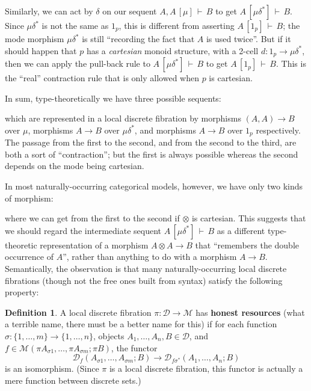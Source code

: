 \documentclass{amsart}
\theoremstyle{definition}
\newtheorem{defn}[thm]{Definition}
\def\M{\mathcal{M}}
\def\D{\mathcal{D}}
\newcommand\seq[3]{\ensuremath{#1 \, [ #2 ] \, \vdash \, #3}}
\begin{document}
Similarly, we can act by $\delta$ on our sequent $\seq{A,A}{\mu}{B}$ to get $\seq{A}{\mu\delta^*}{B}$.
Since $\mu\delta^*$ is not the same as $1_p$, this is different from asserting $\seq{A}{1_p}{B}$; the mode morphism $\mu\delta^*$ is still ``recording the fact that $A$ is used twice''.
But if it should happen that $p$ has a \emph{cartesian} monoid structure, with a 2-cell $d:1_p \to \mu\delta^*$, then we can apply the pull-back rule to $\seq{A}{\mu\delta^*}{B}$ to get $\seq{A}{1_p}{B}$.
This is the ``real'' contraction rule that is only allowed when $p$ is cartesian.

In sum, type-theoretically we have three possible sequents:
which are represented in a local discrete fibration by morphisms $(A,A)\to B$ over $\mu$, morphisms $A\to B$ over $\mu\delta^*$, and morphisms $A\to B$ over $1_p$ respectively.
The passage from the first to the second, and from the second to the third, are both a sort of ``contraction''; but the first is always possible whereas the second depends on the mode being cartesian.

In most naturally-occurring categorical models, however, we have only two kinds of morphism:
where we can get from the first to the second if $\otimes$ is cartesian.
This suggests that we should regard the intermediate sequent $\seq{A}{\mu\delta^*}{B}$ as a different type-theoretic representation of a morphism $A\otimes A\to B$ that ``remembers the double occurrence of $A$'', rather than anything to do with a morphism $A\to B$.
Semantically, the observation is that many naturally-occurring local discrete fibrations (though not the free ones built from syntax) satisfy the following property:

\begin{defn}
  A local discrete fibration $\pi:\D\to\M$ has \textbf{honest resources} (what a terrible name, there must be a better name for this) if
  for each function $\sigma : \{1,\dots,m\} \to \{1,\dots,n\}$, objects $A_1,\dots,A_n,B \in \D$, and $f\in\M(\pi A_{\sigma 1},\dots,\pi A_{\sigma m}; \pi B)$, the functor
  \[\D_f(A_{\sigma 1},\dots,A_{\sigma m}; B) \to \D_{f\sigma^*}(A_1,\dots,A_n;B)\]
  is an isomorphism.
  (Since $\pi$ is a local discrete fibration, this functor is actually a mere function between discrete sets.)
\end{defn}
\end{document}
